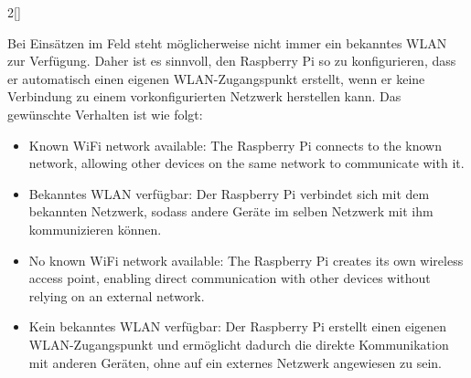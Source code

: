 \begin{paracol}{2}[]
\colger

Bei Einsätzen im Feld steht möglicherweise nicht immer ein bekanntes WLAN zur Verfügung. Daher ist es sinnvoll, den Raspberry Pi so zu konfigurieren, dass er automatisch einen eigenen WLAN-Zugangspunkt erstellt, wenn er keine Verbindung zu einem vorkonfigurierten Netzwerk herstellen kann. Das gewünschte Verhalten ist wie folgt:

\coleng

\begin{itemize}
	\item Known WiFi network available: The Raspberry Pi connects to the known network, allowing other devices on the same network to communicate with it.
\end{itemize}

\colger

\begin{itemize}
	\item Bekanntes WLAN verfügbar: Der Raspberry Pi verbindet sich mit dem bekannten Netzwerk, sodass andere Geräte im selben Netzwerk mit ihm kommunizieren können.
\end{itemize}

\coleng

\begin{itemize}
	\item No known WiFi network available: The Raspberry Pi creates its own wireless access point, enabling direct communication with other devices without relying on an external network.
\end{itemize}

\colger

\begin{itemize}
	\item Kein bekanntes WLAN verfügbar: Der Raspberry Pi erstellt einen eigenen WLAN-Zugangspunkt und ermöglicht dadurch die direkte Kommunikation mit anderen Geräten, ohne auf ein externes Netzwerk angewiesen zu sein.
\end{itemize}

\colende

\renewcommand{\deutschertitel}{Schritt 1: Neue WLAN-Verbindung mit NetworkManager erstellen}
\renewcommand{\englischertitel}{Step 1: Create a New WiFi Connection Using NetworkManager}
\makrounterunterabschnitt

\colende



\end{paracol}

